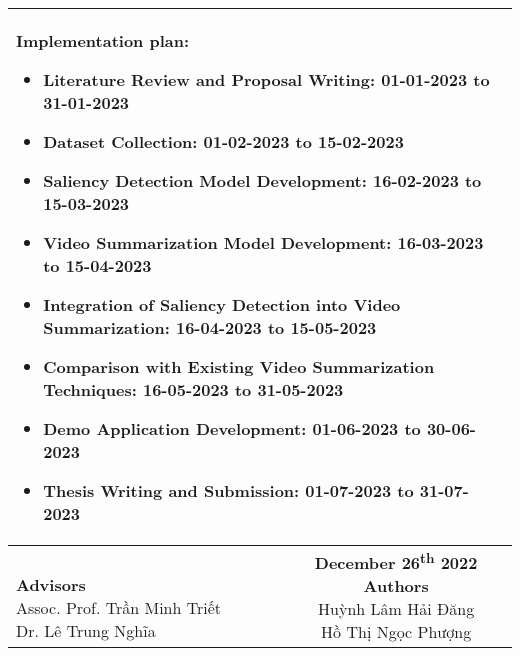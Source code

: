 \begin{longtable}{|l|c|}
\multicolumn{2}{|m{\linewidth}|}{
\textbf{Implementation plan}:
\begin{itemize}
  \item Literature Review and Proposal Writing: 01-01-2023 to 31-01-2023
  \item Dataset Collection: 01-02-2023 to 15-02-2023
  \item Saliency Detection Model Development: 16-02-2023 to 15-03-2023
  \item Video Summarization Model Development: 16-03-2023 to 15-04-2023
  \item Integration of Saliency Detection into Video Summarization: 16-04-2023 to 15-05-2023
  \item Comparison with Existing Video Summarization Techniques: 16-05-2023 to 31-05-2023
  \item Demo Application Development: 01-06-2023 to 30-06-2023
  \item Thesis Writing and Submission: 01-07-2023 to 31-07-2023
\end{itemize}}\\
\hline
\makecell{\\ \textbf{Advisors} \vspace*{2cm} \\ Assoc. Prof. Trần Minh Triết \vspace*{2cm} \\ Dr. Lê Trung Nghĩa} & \makecell{\textbf{December 26\textsuperscript{th} 2022}\\ \textbf{Authors} \vspace*{2cm} \\ Huỳnh Lâm Hải Đăng \vspace*{2cm} \\ Hồ Thị Ngọc Phượng}\\
\hline
\end{longtable}
